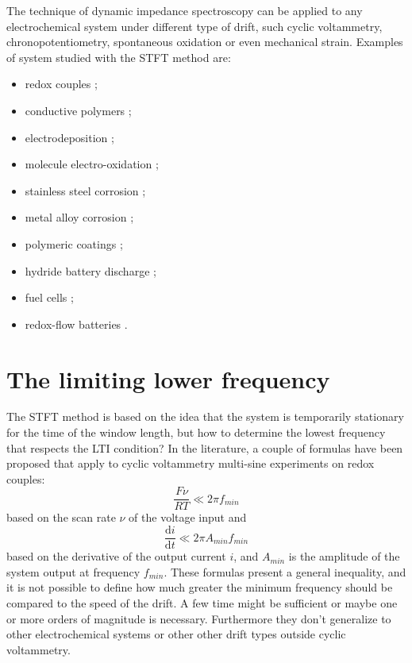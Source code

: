 The technique of dynamic impedance spectroscopy can be applied to any electrochemical system under different type of drift, such cyclic voltammetry, chronopotentiometry, spontaneous oxidation or even mechanical strain. 
Examples of  system studied with the STFT method are:
\begin{itemize}
    \item  redox couples \cite{walczykInvestigationRedoxCouple1995, emeryTimeResolvedImpedance2005, macia2015orp, pajkossyDynamicElectrochemicalImpedance2021}; 
    \item conductive polymers \cite{popkirovInvestigationConductingPolymer1997, darowickiImpedanceCharacterizationProcess2004}; 
    \item electrodeposition \cite{pettitElectrodepositionIndiumMolybdenum2002}; 
    \item molecule electro-oxidation \cite{assiongbonElectrooxidationMethanolGold2005, holmUnderstandingReactionMechanisms2019}; 
    \item stainless steel corrosion \cite{rylInstantaneousImpedanceMonitoring2016, jiOddRandomPhase2018}; 
    \item metal alloy corrosion \cite{wysockaInvestigationElectrochemicalBehaviour2016}; 
    \item polymeric coatings \cite{madelatSituMonitoringLateral2023}; 
    \item hydride battery discharge \cite{slepskiApplicationElectrochemicalImpedance2013}; 
    \item fuel cells \cite{darowickiImpedanceHydrogenOxidation2020a}; 
    \item redox-flow batteries \cite{krakowiakThreeModesElectrochemical2024}.
\end{itemize}

\section{The limiting lower frequency}

The STFT method is based on the idea that the system is temporarily stationary for the time of the window length, but how to determine the lowest frequency that respects the LTI condition?
In the literature, a couple of formulas have been proposed that apply to cyclic voltammetry multi-sine experiments on redox couples\cite{sacciDynamicElectrochemicalImpedance2009}\cite{waltersWeakAdsorptionAnions2001}:
\begin{equation}
    \frac{F\nu}{RT} \ll 2\pi f_{min}
\end{equation}
based on the scan rate $\nu$ of the voltage input and 
\begin{equation}
    \frac{\text{d}i}{\text{d}t} \ll 2\pi A_{min} f_{min}
\end{equation}
based on the derivative of the output current $i$, and $A_{min}$ is the amplitude of the system output at frequency $f_{min}$.
These formulas present a general inequality, and it is not possible to define how much greater the minimum frequency should be compared to the speed of the drift. 
A few time might be sufficient or maybe one or more orders of magnitude is necessary.
Furthermore they don't generalize to other electrochemical systems or other other drift types outside cyclic voltammetry.

